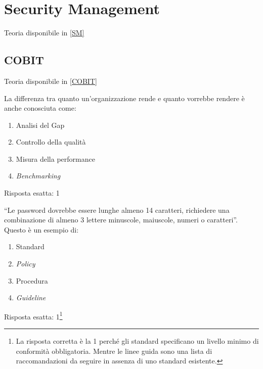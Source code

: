 \chapter{Security Management}
\label{esSM}

Teoria disponibile in \ref{SM}

\section{COBIT}
\label{esSM:COBIT}

Teoria disponibile in \ref{COBIT}

\begin{Exercise} [
  title={Quiz},
  label={esSM1}
  ]

  \Question La differenza tra quanto un'organizzazione rende e quanto 
  vorrebbe rendere è anche conosciuta come:
\begin{enumerate}
 \item Analisi del Gap
 \item Controllo della qualità
 \item Misura della performance
 \item \textit{Benchmarking}
\end{enumerate}

\end{Exercise}

\begin{Answer} [
  ref={esSM1},
  number={1}
  ]

  \Question Risposta esatta: 1
\end{Answer}


\begin{Exercise} [
  title={Quiz},
  label={esSM2}
  ]

  \Question ``Le password dovrebbe essere lunghe almeno 14 caratteri, 
richiedere una combinazione di almeno 3 lettere minuscole, maiuscole, numeri o 
caratteri''. Questo è un esempio di:
\begin{enumerate}
 \item Standard
 \item \textit{Policy}
 \item Procedura
 \item \textit{Guideline}
\end{enumerate}

\end{Exercise}

\begin{Answer} [
  ref={esSM2},
  number={2}
  ]

  \Question Risposta esatta: 1\footnote{La risposta corretta è la 1 perché
  gli standard specificano un livello minimo di conformità obbligatoria.
  Mentre le linee guida sono una lista di raccomandazioni da seguire in
  assenza di uno standard esistente.}
\end{Answer}


